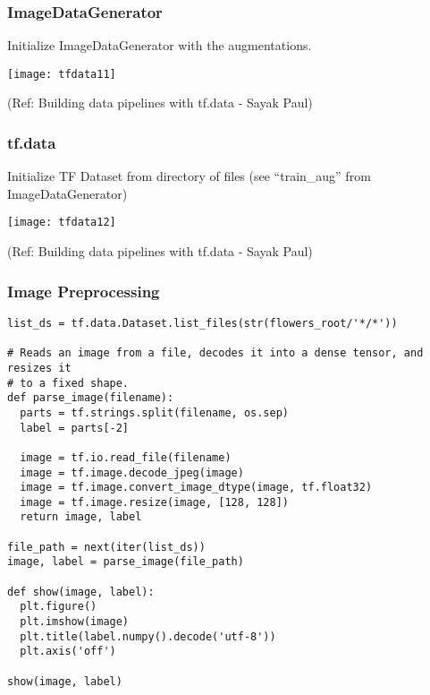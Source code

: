 \begin{frame}[fragile]\frametitle{ImageDataGenerator}

Initialize ImageDataGenerator with the augmentations.

\begin{center}
\texttt{[image: tfdata11]}

{\tiny (Ref: Building data pipelines with tf.data - Sayak Paul)}

\end{center}
\end{frame}

\begin{frame}[fragile]\frametitle{tf.data}

Initialize TF Dataset from directory of files (see ``train\_aug'' from ImageDataGenerator)

\begin{center}
\texttt{[image: tfdata12]}

{\tiny (Ref: Building data pipelines with tf.data - Sayak Paul)}

\end{center}
\end{frame}

\begin{frame}[fragile]\frametitle{Image Preprocessing}

\begin{lstlisting}
list_ds = tf.data.Dataset.list_files(str(flowers_root/'*/*'))

# Reads an image from a file, decodes it into a dense tensor, and resizes it
# to a fixed shape.
def parse_image(filename):
  parts = tf.strings.split(filename, os.sep)
  label = parts[-2]

  image = tf.io.read_file(filename)
  image = tf.image.decode_jpeg(image)
  image = tf.image.convert_image_dtype(image, tf.float32)
  image = tf.image.resize(image, [128, 128])
  return image, label
	
file_path = next(iter(list_ds))
image, label = parse_image(file_path)

def show(image, label):
  plt.figure()
  plt.imshow(image)
  plt.title(label.numpy().decode('utf-8'))
  plt.axis('off')

show(image, label)
\end{lstlisting}
\end{frame}

